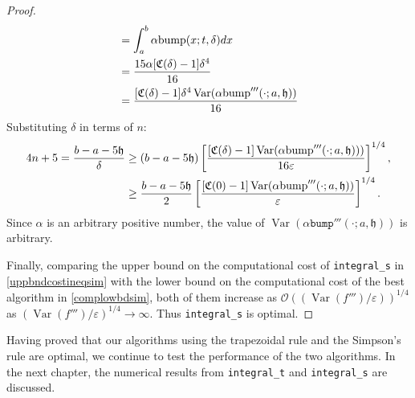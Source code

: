 \documentclass{iitthesis}
\DeclareMathOperator{\Var}{Var}
\theoremstyle{definition}
\theoremstyle{remark}
\begin{document}
\begin{proof}
\begin{subequations}
\begin{align*}
     &=\int_{a}^{b}\alpha\textup{bump}(x;t,\delta)dx\\
     &=\frac{15\alpha[\mathfrak{C}(\delta)-1]\delta^4}{16}\\
     &=\frac{[\mathfrak{C}(\delta)-1]\delta^4\Var(\alpha\textup{bump}'''(\cdot;a,\mathfrak{h}))}{16}
  \end{align*}
  \end{subequations}
  Substituting $\delta$  in terms of $n$:
      \begin{align*}
        4n+5=\frac{b-a-5\mathfrak{h}}{\delta}&\ge(b-a-5\mathfrak{h})\left[\frac{[\mathfrak{C}(\delta)-1]\Var(\alpha \textup{bump}'''(\cdot;a,\mathfrak{h})))}{16\varepsilon}\right]^{1/4},\\
        &\ge\frac{b-a-5\mathfrak{h}}{2}\left[\frac{[\mathfrak{C}(0)-1]\Var(\alpha \textup{bump}'''(\cdot;a,\mathfrak{h}))}{\varepsilon}\right]^{1/4}.
    \end{align*}
    Since $\alpha$ is an arbitrary positive number, the value of $\Var(\alpha \texttt{bump}'''(\cdot;a,\mathfrak{h}))$ is arbitrary.

    Finally, comparing the upper bound on the computational cost of {\tt integral\_s} in \eqref{uppbndcostineqsim} with the lower bound on the computational cost of the best algorithm in \eqref{complowbdsim}, both of them increase as $\mathcal{O}((\Var(f''')/\varepsilon))^{1/4}$ as $(\Var(f''')/\varepsilon)^{1/4}\rightarrow \infty$. Thus {\tt integral\_s} is optimal.
\end{proof}

Having proved that our algorithms using the trapezoidal rule and the Simpson's rule are optimal, we continue to test the performance of the two algorithms. In the next chapter, the numerical results from {\tt integral\_t} and {\tt integral\_s} are discussed.

\end{document}
